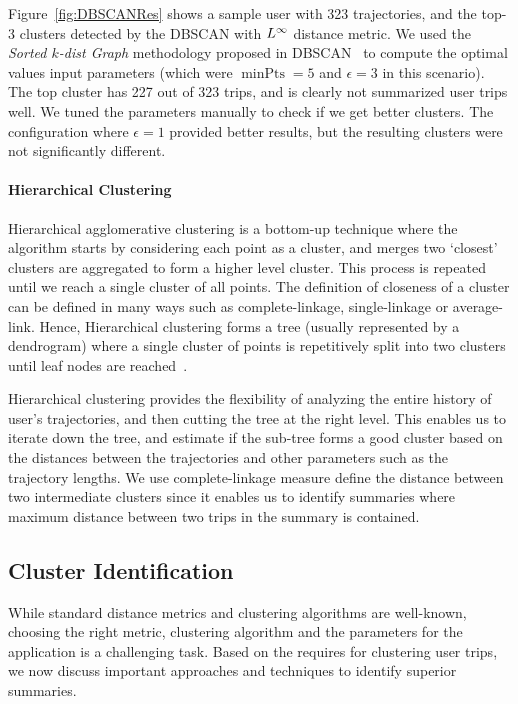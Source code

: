 Figure~\ref{fig:DBSCANRes} shows a sample user with 323 trajectories, and the top-3 clusters detected by the DBSCAN with $L^\infty$ distance metric. We used the \textit{Sorted $k$-dist Graph} methodology proposed in DBSCAN~\cite{ref:dbscan} to compute the optimal values input parameters (which were $\operatorname{minPts}=5$ and $\epsilon=3$ in this scenario). The top cluster has 227 out of 323 trips, and is clearly not summarized user trips well. We tuned the parameters manually to check if we get better clusters. The configuration where $\epsilon=1$ provided better results, but the resulting clusters were not significantly different. 

\paragraph{Hierarchical Clustering}
Hierarchical agglomerative clustering is a bottom-up technique where the algorithm starts by considering each point as a cluster, and merges two `closest' clusters are aggregated to form a higher level cluster. This process is repeated until we reach a single cluster of all points. The definition of closeness of a cluster can be defined in many ways such as complete-linkage, single-linkage or average-link. Hence, Hierarchical clustering forms a tree (usually represented by a dendrogram) where a single cluster of points is repetitively split into two clusters until leaf nodes are reached~\cite{ref:hac}. 

Hierarchical clustering provides the flexibility of analyzing the entire history of user's trajectories, and then cutting the tree at the right level. This enables us to iterate down the tree, and estimate if the sub-tree forms a good cluster based on the distances between the trajectories and other parameters such as the trajectory lengths. We use complete-linkage measure define the distance between two intermediate clusters since it enables us to identify summaries where maximum distance between two trips in the summary is contained.

\subsection{Cluster Identification}
While standard distance metrics and clustering algorithms are well-known, choosing the right metric, clustering algorithm and the parameters for the application is a challenging task. Based on the requires for clustering user trips, we now discuss important approaches and techniques to identify superior summaries. 

